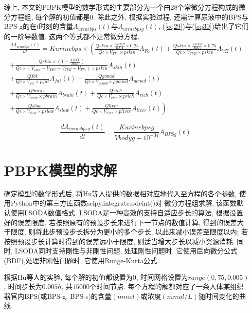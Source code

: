 \documentclass[a4paper,punct=banjiao,twoside]{ctexrep}
\theoremstyle{plain}
\theoremstyle{definition}
\theoremstyle{remark}
\begin{document}
综上, 本文的PBPK模型的数学形式的主要部分为一个由28个常微分方程构成的微分方程组, 每个解的初值都是0.
除此之外, 根据实验过程, 还需计算尿液中的BPS与BPS-g的在$t$时刻的含量$A_{urinebps}(t)$与$A_{urinebpsg}(t)$, (\ref{eq29})与(\ref{eq30})给出了它们的一阶导数值.
这两个等式都不是常微分方程.
\begin{multline}\label{eq29}
  \frac{dA_{urinebps}(t)}{dt}=Kurinebps\times \left(\frac{  Qskin \times  \frac{AEXP}{BSA} \times  0.25}{Qc \times  V_{TFo}  \times  pskin} A_{Fo}(t)
  +\frac{  Qskin \times  \frac{AEXP}{BSA} \times  0.75}{Qc \times  V_{TVE}  \times  pskin} A_{VE}(t)\right.\\
  \left.+\frac{  Qskin \times  (1-\frac{AEXP}{BSA})}{Qc \times  (V_{skin}-V_{TSC}-V_{TVE}-V_{TFo}) \times  pskin} A_{skin}(t)\right.\\
  \left.+\frac{  Qfat}{Qc \times  V_{fat}  \times  pfat} A_{fat}(t)
  +\frac{  Qgonad}{Qc \times  V_{gonad}  \times  pgonad} A_{gonad}(t)\right.\\
  \left.+\frac{  Qbrain}{Qc \times  V_{brain} \times  pbrain} A_{brain}(t)
  +\frac{  Qrich}{Qc \times  V_{rich}  \times  prich} A_{rich}(t)\right.\\
  \left.+\frac{  Qslow}{Qc \times  V_{slow}  \times  pslow} A_{slow}(t)
  +\frac{  Qliver}{Qc \times  V_{liver} \times  pliver} A_{liver}(t)\right).
\end{multline}

\begin{equation}\label{eq30}
  \frac{dA_{urinebpsg}(t)}{dt}=\frac{Kurinebpsg}{Vbodyg+10^{-34} } A_{BPSg}(t).
\end{equation}
\section{PBPK模型的求解}
确定模型的数学形式后, 将Hu等人\cite{11}提供的数据相对应地代入至方程的各个参数, 使用Python中的第三方库函数scipy.integrate.odeint()对
微分方程组求解, 该函数默认使用LSODA数值格式. LSODA是一种高效的支持自适应步长的算法\cite{14}, 根据设置好的误差限度, 若按照原有的预设步长来进行下一节点的数值计算, 得到的误差大于限度, 则将此步预设步长拆分为更小的多个步长, 
以此来减小误差至限度以内; 若按照预设步长计算时得到的误差远小于限度, 则适当增大步长以减小资源消耗. 同时, LSODA同时支持刚性与非刚性问题, 处理刚性问题时, 它使用后向微分公式(BDF),处理非刚性问题时, 它使用Runge-Kutta公式.

根据Hu等人\cite{11}的实验, 每个解的初值都设置为0, 时间网格设置为$range(0,75,0.005)$, 时间步长为$0.005h$, 共$15000$个时间节点.
每个方程的解都对应了一条人体某组织器官内BPS(或BPS-g, BPS-s)的含量$(mmol)$或浓度$(mmol/L)$随时间变化的曲线.
\end{document}
